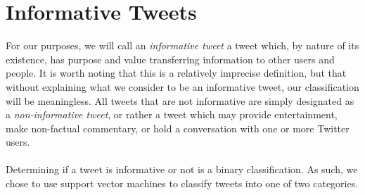 \documentclass[12pt]{article}
\begin{document}
\section{Informative Tweets}
For our purposes, we will call an {\it informative tweet} a tweet which, by nature of its existence, has purpose and value transferring information to other users and people. It is worth noting that this is a relatively imprecise definition, but that without explaining what we consider to be an informative tweet, our classification will be meaningless. All tweets that are not informative are simply designated as a {\it non-informative tweet}, or rather a tweet which may provide entertainment, make non-factual commentary, or hold a conversation with one or more Twitter users. 
\\
\\
Determining if a tweet is informative or not is a binary classification. As such, we chose to use support vector machines to classify tweets into one of two categories. 
\end{document}
